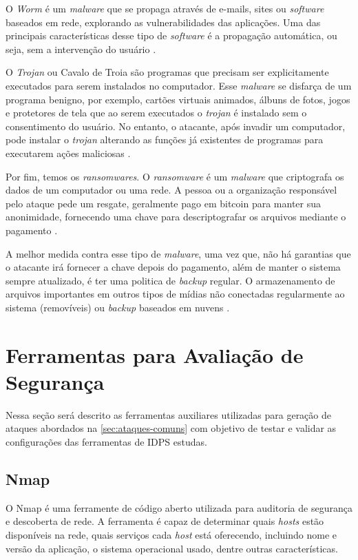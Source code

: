  O \textit{Worm} é um \textit{malware} que se propaga através de e-mails, sites ou \textit{software} baseados em rede, explorando as vulnerabilidades das aplicações. Uma das principais características desse tipo de \textit{software} é a propagação automática, ou seja, sem a intervenção do usuário \cite{detectingworm}. 

 O \textit{Trojan} ou Cavalo de Troia são programas que precisam ser explicitamente executados para serem instalados no computador. Esse \textit{malware} se disfarça de um programa benigno, por exemplo, cartões virtuais animados, álbuns de fotos, jogos e protetores de tela que ao serem executados o \textit{trojan} é instalado sem o consentimento do usuário. No entanto, o atacante, após invadir um computador, pode instalar o \textit{trojan} alterando as funções já existentes de programas para executarem ações maliciosas \cite{certs-malwares}.

 Por fim, temos os \textit{ransomwares}. O \textit{ransomware} é um \textit{malware} que criptografa os dados de um computador ou uma rede. A pessoa ou a organização responsável pelo ataque pede um resgate, geralmente pago em bitcoin para manter sua anonimidade, fornecendo uma chave para descriptografar os arquivos mediante o pagamento \cite{ransomware:matt}.

 A melhor medida contra esse tipo de \textit{malware}, uma vez que, não há garantias que o atacante irá fornecer a chave depois do pagamento, além de manter o sistema sempre atualizado, é ter uma politica de \textit{backup} regular. O armazenamento de arquivos importantes em outros tipos de mídias não conectadas regularmente ao sistema (removíveis) ou \textit{backup} baseados em nuvens \cite{ransomware:matt}.

 \section{Ferramentas para Avaliação de Segurança} \label{sec:ferramentas}

 Nessa seção será descrito as ferramentas auxiliares utilizadas para geração de ataques abordados na \autoref{sec:ataques-comuns} com objetivo de testar e validar as configurações das ferramentas de IDPS estudas. 

 \subsection{Nmap} \label{sec:nmap}

 O Nmap é uma ferramente de código aberto utilizada para auditoria de segurança e descoberta de rede. A ferramenta é capaz de determinar quais \textit{hosts} estão disponíveis na rede, quais serviços cada \textit{host} está oferecendo, incluindo nome e versão da aplicação, o sistema operacional usado, dentre outras características.  

